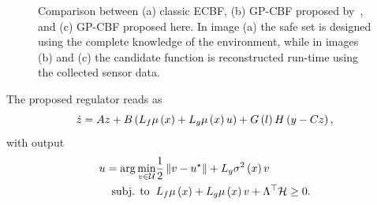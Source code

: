 \begin{figure}[!t]
\begin{center}
\begin{minipage}{.45\linewidth}
		\end{minipage}
		\begin{minipage}{.45\linewidth}
			\centering
		\end{minipage}
	\end{center}
	\caption{Comparison between (a) classic ECBF, (b) GP-CBF proposed by~\cite{khan2022gaussian}, and (c) GP-CBF proposed here.
    In image (a) the safe set is designed using the complete knowledge of the environment, while in images (b) and (c) the
    candidate function is reconstructed run-time using the collected sensor data.}%
    \label{FIG:CBF-RESULTS-COMPARISON}
\end{figure}
The proposed regulator reads as
\begin{equation}%
    \label{EQ:CBF-PROPOSED-OBSERVER}
    \dot{\zz} = A\zz + B \lp L_{\xfun} \pmu \lp \xx \rp + L_{\ufun} \pmu \lp \xx \rp \uu \rp + G \lp l \rp H \lp \yy - C\zz \rp,
\end{equation}
with output
\begin{equation}%
    \label{EQ:CBF-PROPOSED-OPTIMISATION-PROBLEM}
    \begin{split}
        \uu = \arg \min_{v \in \uset} & \frac{1}{2} \norm{v - \uu\s} + L_{\ufun} \pvar \lp \xx \rp v \\
        \text{subj. to} \hspace{0.2cm} & L_{\xfun} \pmu \lp \xx \rp + L_{\ufun} \pmu \lp \xx \rp v + \Lambda\T\HH \ge 0.
    \end{split}
\end{equation}
